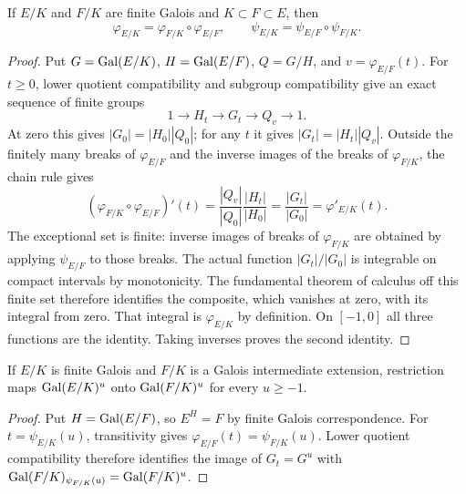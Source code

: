 \begin{theorem}
\label{fw:herbrand-transitivity}
\leanok
If $E/K$ and $F/K$ are finite Galois and $K\subset F\subset E$, then
\[
 \varphi_{E/K}=\varphi_{F/K}\circ\varphi_{E/F},\qquad
 \psi_{E/K}=\psi_{E/F}\circ\psi_{F/K}.
\]
\end{theorem}
\begin{proof}
Put $G=\operatorname{Gal}(E/K)$, $H=\operatorname{Gal}(E/F)$, $Q=G/H$, and
$v=\varphi_{E/F}(t)$. For $t\geq0$, lower quotient compatibility and
subgroup compatibility give an exact sequence of finite groups
\[
 1\longrightarrow H_t\longrightarrow G_t\longrightarrow Q_v
 \longrightarrow1.
\]
At zero this gives $|G_0|=|H_0||Q_0|$; for any $t$ it gives
$|G_t|=|H_t||Q_v|$.
Outside the finitely many breaks of $\varphi_{E/F}$ and the inverse
images of the breaks of $\varphi_{F/K}$, the chain rule gives
\[
 (\varphi_{F/K}\circ\varphi_{E/F})'(t)
    =\frac{|Q_v|}{|Q_0|}\frac{|H_t|}{|H_0|}
    =\frac{|G_t|}{|G_0|}=\varphi'_{E/K}(t).
\]
The exceptional set is finite: inverse images of breaks of
$\varphi_{F/K}$ are obtained by applying $\psi_{E/F}$ to those breaks.
The actual function $|G_t|/|G_0|$ is integrable on compact intervals by
monotonicity. The fundamental theorem of calculus off this finite set
therefore identifies the composite, which vanishes at zero, with its
integral from zero. That integral is $\varphi_{E/K}$ by definition.
On $[-1,0]$ all three functions are the identity.
Taking inverses proves the second identity.
\end{proof}

\begin{theorem}
\label{fw:herbrand-quotients}
\leanok
If $E/K$ is finite Galois and $F/K$ is a Galois intermediate extension,
restriction maps $\operatorname{Gal}(E/K)^u$ onto $\operatorname{Gal}(F/K)^u$ for every $u\geq-1$.
\end{theorem}
\begin{proof}
Put $H=\operatorname{Gal}(E/F)$, so $E^H=F$ by finite Galois correspondence.
For $t=\psi_{E/K}(u)$, transitivity gives
$\varphi_{E/F}(t)=\psi_{F/K}(u)$. Lower quotient compatibility therefore
identifies the image of $G_t=G^u$ with
$\operatorname{Gal}(F/K)_{\psi_{F/K}(u)}=\operatorname{Gal}(F/K)^u$.
\end{proof}

